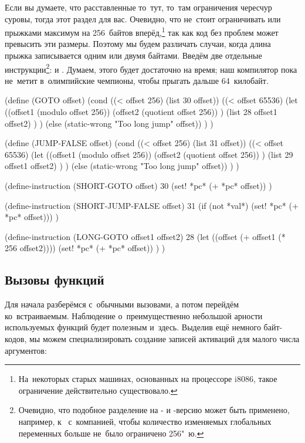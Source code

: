 Если вы думаете, что расставленные то~тут, то~там ограничения чересчур суровы,
тогда этот раздел для вас. Очевидно, что не~стоит ограничивать  или
 прыжками максимум на 256~байтов вперёд,\footnote*{На~некоторых
старых машинах, основанных на процессоре i8086, такое ограничение действительно
существовало.} так как код без проблем может превысить эти размеры. Поэтому мы
будем различать случаи, когда длина прыжка записывается одним или двумя байтами.
Введём две отдельные инструкции\footnote{Очевидно, что подобное разделение на
- и -версию может быть применено, например, к~
с~компанией, чтобы количество изменяемых глобальных переменных больше не~было
ограничено 256"~ю.}:  и . Думаем, этого будет
достаточно на время; наш компилятор пока не~метит в~олимпийские чемпионы, чтобы
прыгать дальше 64~килобайт.

\begin{code:lisp}
(define (GOTO offset)
  (cond ((< offset 256) (list 30 offset))
        ((< offset 65536)
         (let ((offset1 (modulo offset 256))
               (offset2 (quotient offset 256)) )
           (list 28 offset1 offset2) ) )
        (else (static-wrong "Too long jump" offset)) ) )

(define (JUMP-FALSE offset)
  (cond ((< offset 256) (list 31 offset))
        ((< offset 65536)
         (let ((offset1 (modulo offset 256))
               (offset2 (quotient offset 256)) )
           (list 29 offset1 offset2) ) )
        (else (static-wrong "Too long jump" offset)) ) )

(define-instruction (SHORT-GOTO offset) 30
  (set! *pc* (+ *pc* offset)) )

(define-instruction (SHORT-JUMP-FALSE offset) 31
  (if (not *val*) (set! *pc* (+ *pc* offset))) )

(define-instruction (LONG-GOTO offset1 offset2) 28
  (let ((offset (+ offset1 (* 256 offset2))))
    (set! *pc* (+ *pc* offset)) ) )
\end{code:lisp}


\subsection{Вызовы функций}\label{compilation/instruction/ssect:invocations}

Для начала разберёмся с~обычными вызовами, а потом перейдём ко~встраиваемым.
Наблюдение о~преимущественно небольшой арности используемых функций будет
полезным и~здесь. Выделив ещё немного байт-кодов, мы можем специализировать
создание записей активаций для малого числа аргументов:

